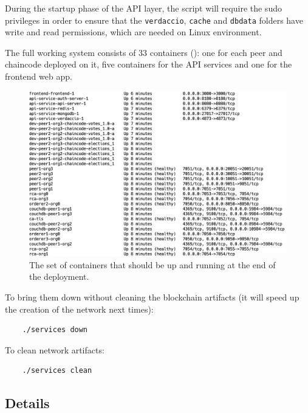\documentclass{scrartcl}
\begin{document}
\begin{warn}
    During the startup phase of the API layer, the script will require the sudo privileges in order to ensure that the \texttt{verdaccio}, \texttt{cache} and \texttt{dbdata} folders have write and read permissions, which are needed on Linux environment.
\end{warn}

The full working system consists of 33 containers (): one for each peer and chaincode deployed on it, five containers for the API services and one for the frontend web app.

\begin{figure}[h!]
    \centering
    \includegraphics[width=\linewidth]{figures/containers.png}
    \caption{The set of containers that should be up and running at the end of the deployment.}
    \label{fig:containers} 
\end{figure}

To bring them down without cleaning the blockchain artifacts (it will speed up the creation of the network next times):

\begin{verbatim}
    ./services down
\end{verbatim}

To clean network artifacts:

\begin{verbatim}
    ./services clean
\end{verbatim}

\iffalse

\subsection{Details}
\label{deployment-details}
\end{document}
